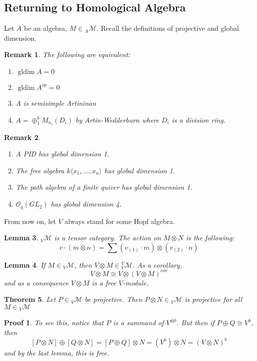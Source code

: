 \documentclass[12pt]{article}
\theoremstyle{break}
\theoremstyle{nonumberbreak}
\theoremstyle{changebreak}
\newtheorem{thm}{Theorem}[subsection]
\newtheorem{lem}[thm]{Lemma}
\theoremstyle{break}
\theoremstyle{nonumberbreak}
\newtheorem{prf}{Proof}
\theoremstyle{nonumberplain}
\theoremstyle{change}
\newtheorem{rmk}[thm]{Remark}
\DeclareMathOperator{\gldim}{gldim}
\newcommand*{\calM}{\mathcal{M}}
\begin{document}
\subsection{Returning to Homological Algebra}
Let $A$ be an algebra, $M\in {_A\mathcal{M}}$. Recall the definitions of projective and global dimension.
\begin{rmk}
	The following are equivalent:
	\begin{enumerate}
		\item $\gldim A=0$
		\item $\gldim A^{op}=0$
		\item $A$ is semisimple Artininan
		\item $A=\oplus_1^b M_{n_i}(D_i)$ by Artin-Wedderburn where $D_i$ is a division ring.
	\end{enumerate}
\end{rmk}
\begin{rmk}
	\begin{enumerate}
		\item A PID has global dimension 1. 
		\item The free algebra $k\langle x_1,\dots,x_n\rangle$ has global dimension 1.
		\item The path algebra of a finite quiver has global dimension 1.
		\item $\mathcal{O}_q(GL_2)$ has global dimension 4.
	\end{enumerate}
\end{rmk}

From now on, let $V$ always stand for some Hopf algebra.
\begin{lem}
	${_V\mathcal{M}}$ is a tensor category. The action on $M\otimes N$ is the following:
	\[v\cdot (m\otimes n)=\sum (v_{(1)}\cdot m)\otimes (v_{(2)}\cdot n)\]
\end{lem}
\begin{lem}
	If $M\in {_V\mathcal{M}}$, then $V\otimes M\in {_V^V\mathcal{M}}$. As a corollary,
	\[V\otimes M\cong V\otimes (V\otimes M)^{cov}\]
	and as a consequence $V\otimes M$ is a free $V$-module.
\end{lem}

\begin{thm}
	Let $P\in {_V\calM}$ be projective. Then $P\otimes N\in {_V\calM}$ is projective for all $M\in{_V\calM}$
\end{thm}
\begin{prf}
	To see this, notice that $P$ is a summand of $V^{\oplus b}$. But then if $P\oplus Q\cong V^{b}$, then 
	\[[P\otimes N]\oplus[Q\otimes N]=[P\oplus Q]\otimes N=(V^b)\otimes N=(V\otimes N)^b\]
	and by the last lemma, this is free.
\end{prf}
\end{document}
